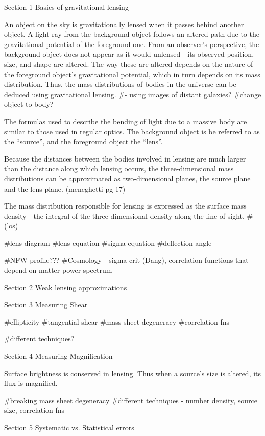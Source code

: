 Section 1
Basics of gravitational lensing

An object on the sky is gravitationally lensed when it passes behind another object.
A light ray from the background object follows an altered path due to the gravitational potential of the foreground one.
From an observer's perspective, the background object does not appear as it would unlensed - its observed position, size, and shape are altered.
The way these are altered depends on the nature of the foreground object's gravitational potential, which in turn depends on its mass distribution.
Thus, the mass distributions of bodies in the universe can be deduced using gravitational lensing. #- using images of distant galaxies?
#change object to body?

The formulas used to describe the bending of light due to a massive body are similar to those used in regular optics.
The background object is be referred to as the ``source'', and the foreground object the ``lens''.

Because the distances between the bodies involved in lensing are much larger than the distance along which lensing occurs, the three-dimensional mass distributions can be approximated as two-dimensional planes, the source plane and the lens plane. (meneghetti pg 17)

The mass distribution responsible for lensing is expressed as the surface mass density - the integral of the three-dimensional density along the line of sight. #(los)

#lens diagram
#lens equation
#sigma equation
#deflection angle



#NFW profile???
#Cosmology - sigma crit (Dang), correlation functions that depend on matter power spectrum


Section 2
Weak lensing approximations


Section 3
Measuring Shear

#ellipticity
#tangential shear
#mass sheet degeneracy
#correlation fns

#different techniques? 

Section 4
Measuring Magnification

Surface brightness is conserved in lensing. Thus when a source's size is altered, its flux is magnified.

#breaking mass sheet degeneracy
#different techniques - number density, source size, correlation fns

Section 5
Systematic vs. Statistical errors


